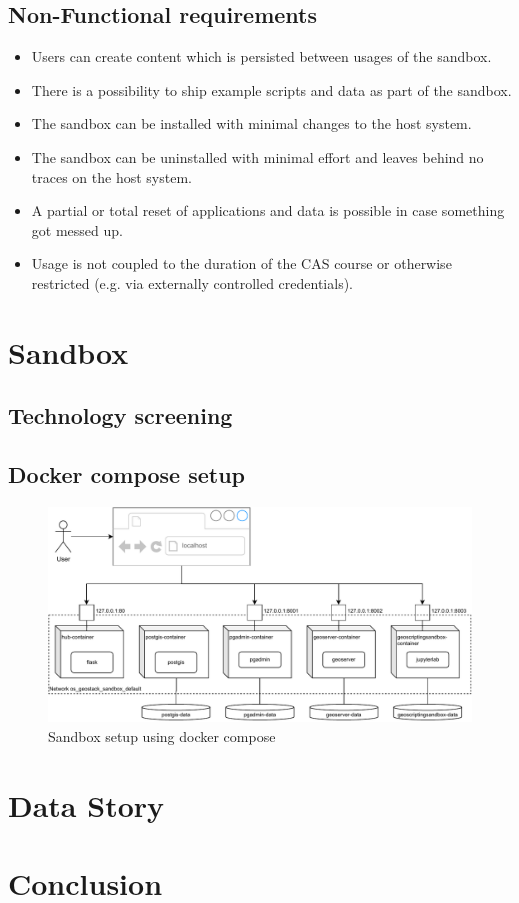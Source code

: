 \documentclass[11pt, a4paper, oneside, parskip=full-]{scrartcl}
\begin{document}
\subsection{Non-Functional requirements}
\begin{itemize}
  \item Users can create content which is persisted between usages of the
  sandbox.
  \item There is a possibility to ship example scripts and data as part of the
  sandbox.
  \item The sandbox can be installed with minimal changes to the host system.
  \item The sandbox can be uninstalled with minimal effort and leaves behind no
  traces on the host system.
  \item A partial or total reset of applications and data is possible in case
  something got messed up.
  \item Usage is not coupled to the duration of the CAS course or otherwise
  restricted (e.g. via externally controlled credentials).
\end{itemize}

\section{Sandbox}
\subsection{Technology screening}
\subsection{Docker compose setup}
\begin{figure}[H]
  \centering
  \includegraphics[width=1\textwidth]{compose_setup}
  \caption{Sandbox setup using docker compose}
  \label{fig:sandboxsetup}
\end{figure}

\section{Data Story}

\section{Conclusion}
\end{document}
